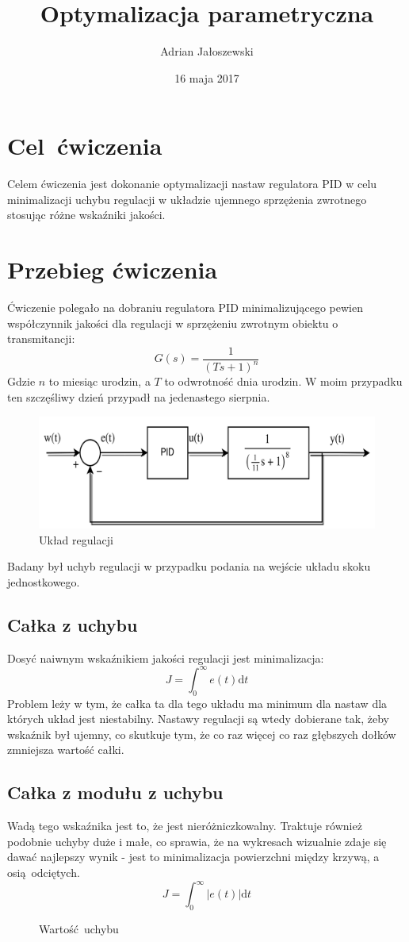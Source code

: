 \documentclass[a4paper, 10pt]{article}
\title{Optymalizacja parametryczna}
\author{Adrian Jałoszewski}
\date{16 maja 2017}
\begin{document}
    \maketitle
	\section{Cel ćwiczenia}
		Celem ćwiczenia jest dokonanie optymalizacji nastaw regulatora PID w celu minimalizacji uchybu regulacji w układzie ujemnego sprzężenia zwrotnego stosując różne wskaźniki jakości.
	\section{Przebieg ćwiczenia}
		Ćwiczenie polegało na dobraniu regulatora PID minimalizującego pewien współczynnik jakości dla regulacji w sprzężeniu zwrotnym obiektu o transmitancji: 
		$$
			G(s) = \frac{1}{(Ts + 1)^n}
		$$
		Gdzie $n$ to miesiąc urodzin, a $T$ to odwrotność dnia urodzin. W moim przypadku ten szczęśliwy dzień przypadł na jedenastego sierpnia.
		\begin{figure}[H]
			\centering
			\includegraphics[width =0.8\columnwidth]{schemat.png}
			\caption{Układ regulacji}
		\end{figure} \noindent
		Badany był uchyb regulacji w przypadku podania na wejście układu skoku jednostkowego.
		\subsection{Całka z uchybu}
			Dosyć naiwnym wskaźnikiem jakości regulacji jest minimalizacja:
			$$
				J = \int_0^\infty
				e(t) \mathrm{d}t
			$$
			Problem leży w tym, że całka ta dla tego układu ma minimum dla nastaw dla których układ jest niestabilny. Nastawy regulacji są wtedy dobierane tak, żeby wskaźnik był ujemny, co skutkuje tym, że co raz więcej co raz głębszych dołków zmniejsza wartość całki.
		\subsection{Całka z modułu z uchybu}
			Wadą tego wskaźnika jest to, że jest nieróżniczkowalny. Traktuje również podobnie uchyby duże i małe, co sprawia, że na wykresach wizualnie zdaje się dawać najlepszy wynik - jest to minimalizacja powierzchni między krzywą, a osią odciętych.
			$$
				J = \int_0^\infty
				|e(t)| \mathrm{d}t
			$$
			\begin{figure}[H]
				\centering
				\def \svgwidth{0.65\columnwidth}
				
				\caption{Wartość uchybu}
			\end{figure}\noindent
\end{document}
